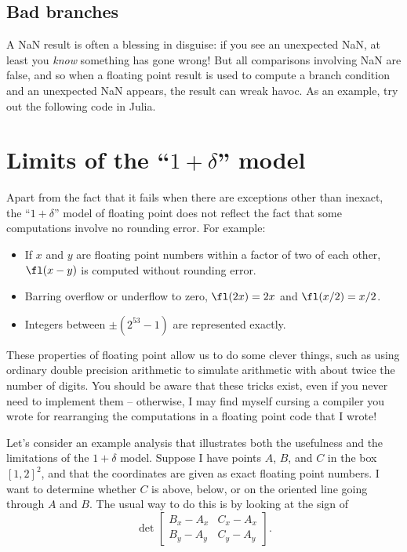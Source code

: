 \documentclass[12pt, leqno]{article}
\begin{document}
\subsection*{Bad branches}

A NaN result is often a blessing in disguise: if you see an
unexpected NaN, at least you {\em know} something has gone wrong!
But all comparisons involving NaN are false,  and so
when a floating point result is used to compute a branch condition
and an unexpected NaN appears, the result can wreak havoc.
As an example, try out the following code in Julia.

\lstset{language=matlab,frame=lines,columns=flexible}


\section*{Limits of the ``$1+\delta$'' model}

Apart from the fact that it fails when there are exceptions other than
inexact, the ``$1+\delta$'' model of floating point does not reflect
the fact that some computations involve no rounding error.  For example:
\begin{itemize}
\item
  If $x$ and $y$ are floating point numbers within a factor of two of
  each other, $\fl(x-y)$ is computed without rounding error.
\item
  Barring overflow or underflow to zero, $\fl(2x) = 2x$ and $\fl(x/2) = x/2$.
\item
  Integers between $\pm (2^{53}-1)$ are represented exactly.
\end{itemize}
These properties of floating point allow us to do some clever things,
such as using ordinary double precision arithmetic to simulate
arithmetic with about twice the number of digits.  You should be aware
that these tricks exist, even if you never need to implement them --
otherwise, I may find myself cursing a compiler you
wrote for rearranging the computations in a floating point code that I
wrote!

Let's consider an example analysis that illustrates both the
usefulness and the limitations of the $1+\delta$ model.  Suppose
I have points $A$, $B$, and $C$ in the box $[1,2]^2$, and that the
coordinates are given as exact floating point numbers.  I want to
determine whether $C$ is above, below, or on the oriented line going through
$A$ and $B$.  The usual way to do this is by looking at the sign of
\[
  \det \begin{bmatrix} B_x-A_x & C_x-A_x \\ B_y-A_y & C_y-A_y \end{bmatrix}.
\]
\end{document}
